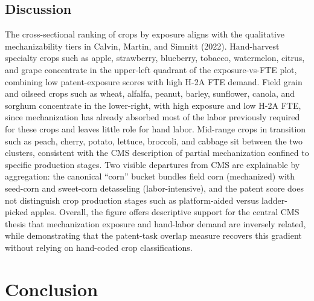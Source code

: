 \documentclass[11pt]{article}
\begin{document}
\subsection{Discussion}

The cross-sectional ranking of crops by exposure aligns with the qualitative mechanizability tiers in Calvin, Martin, and Simnitt (2022). Hand-harvest specialty crops such as apple, strawberry, blueberry, tobacco, watermelon, citrus, and grape concentrate in the upper-left quadrant of the exposure-vs-FTE plot,
combining low patent-exposure scores with high H-2A FTE demand. Field grain and oilseed crops such as wheat, alfalfa, peanut, barley, sunflower, canola, and sorghum concentrate in the lower-right, with high exposure and low H-2A FTE, since mechanization has already absorbed most of the labor previously required for
these crops and leaves little role for hand labor. Mid-range crops in transition such as peach, cherry, potato, lettuce, broccoli, and cabbage sit between the two clusters, consistent with the CMS description of partial mechanization confined to specific production stages. Two visible departures from CMS are explainable by aggregation: the canonical ``corn'' bucket bundles field corn (mechanized) with seed-corn and sweet-corn detasseling (labor-intensive), and the patent score does not distinguish crop production stages such as platform-aided versus ladder-picked apples. Overall, the figure offers descriptive support for the central CMS thesis that mechanization exposure and hand-labor demand are inversely related, while demonstrating that the patent-task overlap measure recovers this gradient without relying on hand-coded crop classifications.


\section{Conclusion}
\end{document}
